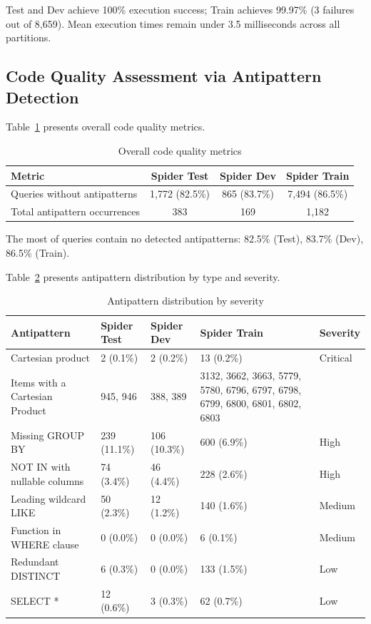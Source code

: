 \documentclass[]{einformatica}
\begin{document}
Test and Dev achieve 100\% execution success; Train achieves 99.97\% (3 failures out of 8,659). Mean execution times remain under 3.5 milliseconds across all partitions.

\subsection{Code Quality Assessment via Antipattern Detection}\label{sec:antipattern_results}

Table~\ref{tab:antipatterns_overall} presents overall code quality metrics.

\begin{table}[ht]
    \caption{Overall code quality metrics}
    \label{tab:antipatterns_overall}
    \centering
    \footnotesize
    \begin{tabular}{lccc}
        \toprule
        \textbf{Metric} & \textbf{Spider Test} & \textbf{Spider Dev} & \textbf{Spider Train} \\
        \midrule
        Queries without antipatterns & 1,772 (82.5\%) & 865 (83.7\%) & 7,494 (86.5\%) \\
        Total antipattern occurrences & 383 & 169 & 1,182 \\
        \bottomrule
    \end{tabular}
\end{table}

The most of queries contain no detected antipatterns: 82.5\% (Test), 83.7\% (Dev), 86.5\% (Train).

Table~\ref{tab:antipatterns_top5} presents antipattern distribution by type and severity.

\begin{table}[ht]
    \caption{Antipattern distribution by severity}
    \label{tab:antipatterns_top5}
    \centering
    \footnotesize
    \begin{tabular}{lp{}p{}p{}l}
        \toprule
        \textbf{Antipattern} & \textbf{Spider Test} & \textbf{Spider Dev} & \textbf{Spider Train} & \textbf{Severity} \\
        \midrule
        Cartesian product & 2 (0.1\%) & 2 (0.2\%) & 13 (0.2\%) & Critical \\
        Items with a Cartesian Product & 945, 946 & 388, 389 & 3132, 3662, 3663, 5779, 5780, 6796, 6797, 6798, 6799, 6800, 6801, 6802, 6803 & \\
        Missing GROUP BY & 239 (11.1\%) & 106 (10.3\%) & 600 (6.9\%) & High \\
        NOT IN with nullable columns & 74 (3.4\%) & 46 (4.4\%) & 228 (2.6\%) & High \\
        Leading wildcard LIKE & 50 (2.3\%) & 12 (1.2\%) & 140 (1.6\%) & Medium \\
        Function in WHERE clause & 0 (0.0\%) & 0 (0.0\%) & 6 (0.1\%) & Medium \\
        Redundant DISTINCT & 6 (0.3\%) & 0 (0.0\%) & 133 (1.5\%) & Low \\
        SELECT * & 12 (0.6\%) & 3 (0.3\%) & 62 (0.7\%) & Low \\
        \bottomrule
    \end{tabular}
\end{table}
\end{document}
